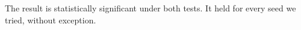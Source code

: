 The result is statistically significant under both tests.
It held for every seed we tried, without exception.
